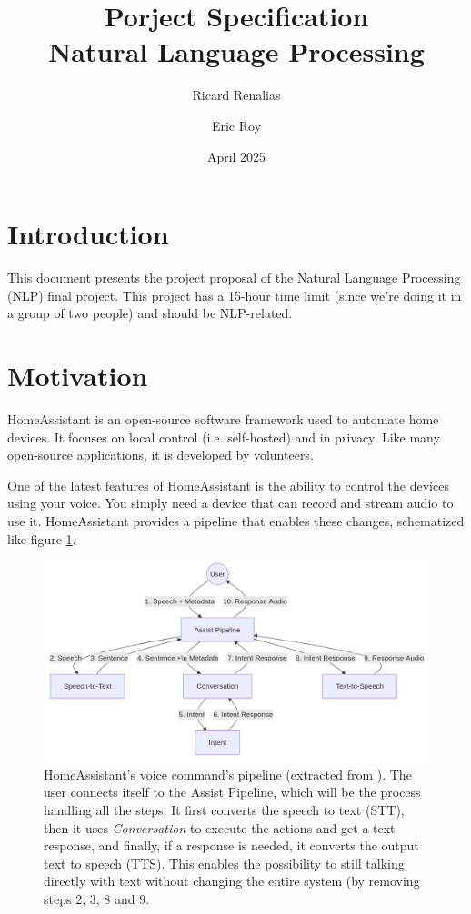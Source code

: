 \documentclass{article}
\title{\textbf{Porject Specification}\\Natural Language Processing}
\author{Ricard Renalias \and Eric Roy}
\date{April 2025}
\begin{document}
\maketitle

\section{Introduction}

This document presents the project proposal of the Natural Language Processing (NLP) final project. This project has a 15-hour time limit (since we're doing it in a group of two people) and should be NLP-related.

\section{Motivation}

HomeAssistant \cite{homeassistant} is an open-source software framework used to automate home devices. It focuses on local control (i.e. self-hosted) and in privacy. Like many open-source applications, it is developed by volunteers.

One of the latest features of HomeAssistant is the ability to control the devices using your voice. You simply need a device that can record and stream audio to use it. HomeAssistant provides a pipeline that enables these changes, schematized like figure \ref{fig:ha-pipeline}.

\begin{figure}[H]
    \centering
    \includegraphics[width=0.75\linewidth]{pipeline_home_assistant.png}
    \caption{
    HomeAssistant's voice command's pipeline (extracted from \cite{homeassistantvoice}).
    The user connects itself to the Assist Pipeline, which will be the process handling all
    the steps. It first converts the speech to text (STT), then it uses \textit{Conversation} to
    execute the actions and get a text response, and finally, if a response is needed, it
    converts the output text to speech (TTS). This enables the possibility to still talking directly with text without changing the entire system (by removing steps 2, 3, 8 and 9.
    }
    \label{fig:ha-pipeline}
\end{figure}
\end{document}
